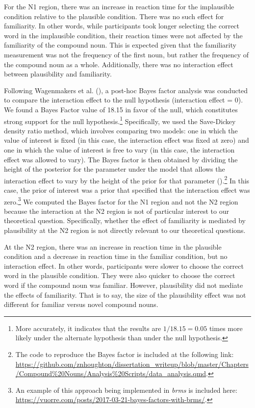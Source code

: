 \documentclass[
  12pt,
  letterpaper,
]{scrreport}
\begin{document}
For the N1 region, there was an increase in reaction time for the
implausible condition relative to the plausible condition. There was no
such effect for familiarity. In other words, while participants took
longer selecting the correct word in the implausible condition, their
reaction times were not affected by the familiarity of the compound
noun. This is expected given that the familiarity measurement was not
the frequency of the first noun, but rather the frequency of the
compound noun as a whole. Additionally, there was no interaction effect
between plausibility and familiarity.

Following Wagenmakers et al.
(), a
post-hoc Bayes factor analysis was conducted to compare the interaction
effect to the null hypothesis (interaction effect = 0). We found a Bayes
Factor value of 18.15 in favor of the null, which constitutes strong
support for the null hypothesis.\footnote{More accurately, it indicates
  that the results are \(1/18.15=0.05\) times more likely under the
  alternate hypothesis than under the null hypothesis.} Specifically, we
used the Save-Dickey density ratio method, which involves comparing two
models: one in which the value of interest is fixed (in this case, the
interaction effect was fixed at zero) and one in which the value of
interest is free to vary (in this case, the interaction effect was
allowed to vary). The Bayes factor is then obtained by dividing the
height of the posterior for the parameter under the model that allows
the interaction effect to vary by the height of the prior for that
parameter
().\footnote{The code to reproduce the Bayes factor is included
  at the following link:
  \url{https://github.com/znhoughton/dissertation_writeup/blob/master/Chapters/Compound\%20Nouns/Analysis\%20Scripts/data_analysis.qmd}.}
In this case, the prior of interest was a prior that specified that the
interaction effect was zero.\footnote{An example of this approach being
  implemented in \emph{brms} is included here:
  \url{https://vuorre.com/posts/2017-03-21-bayes-factors-with-brms/}.}
We computed the Bayes factor for the N1 region and not the N2 region
because the interaction at the N2 region is not of particular interest
to our theoretical question. Specifically, whether the effect of
familiarity is mediated by plausibility at the N2 region is not directly
relevant to our theoretical questions.

At the N2 region, there was an increase in reaction time in the
plausible condition and a decrease in reaction time in the familiar
condition, but no interaction effect. In other words, participants were
slower to choose the correct word in the plausible condition. They were
also quicker to choose the correct word if the compound noun was
familiar. However, plausibility did not mediate the effects of
familiarity. That is to say, the size of the plausibility effect was not
different for familiar versus novel compound nouns.
\end{document}
